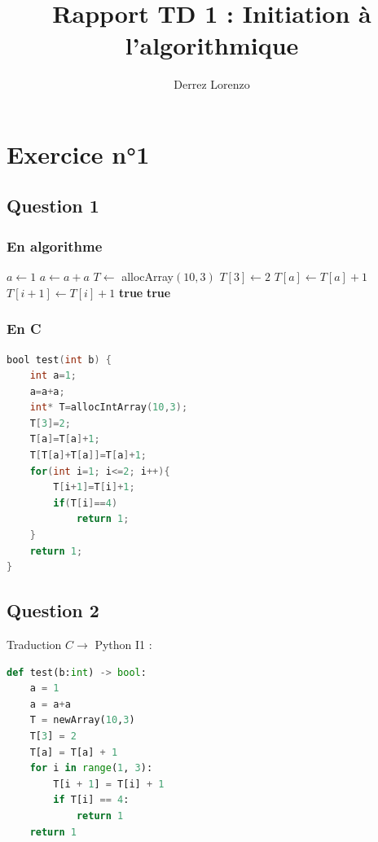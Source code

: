 \documentclass{article}
\title{Rapport TD 1 : Initiation à l'algorithmique}
\author{Derrez Lorenzo}
\begin{document}
\maketitle

\section{Exercice n°1}
\subsection{Question 1 }
\subsubsection{En algorithme}
\begin{algorithm}
    \caption{Test}
    \begin{algorithmic}[1]
            \State $a \gets 1$
            \State $a \gets a+a$
            \State $T \gets$ allocArray$(10,3)$
            \State $T[3] \gets 2$
            \State $T[a] \gets T[a]+1$
                \State $T[i+1] \gets T[i] + 1$
                    \State \Return \textbf{true}
                \EndIf
            \EndFor
            \State \Return \textbf{true}
        \EndProcedure
    \end{algorithmic}
\end{algorithm}
\subsubsection{En C}
\begin{lstlisting}[language=C, caption={Exercice 1 question 1}]
bool test(int b) {
    int a=1;
    a=a+a;
    int* T=allocIntArray(10,3);
    T[3]=2;
    T[a]=T[a]+1;
    T[T[a]+T[a]]=T[a]+1;
    for(int i=1; i<=2; i++){
        T[i+1]=T[i]+1;
        if(T[i]==4)
            return 1;
    }
    return 1;
}
\end{lstlisting}

\subsection{Question 2}
Traduction $C \rightarrow$ Python I1 : \\
\begin{lstlisting}[language = Python, caption = {Exercice 1 question 2}]
def test(b:int) -> bool:
    a = 1
    a = a+a 
    T = newArray(10,3)
    T[3] = 2
    T[a] = T[a] + 1
    for i in range(1, 3): 
        T[i + 1] = T[i] + 1 
        if T[i] == 4: 
            return 1 
    return 1

\end{lstlisting}
\end{document}
